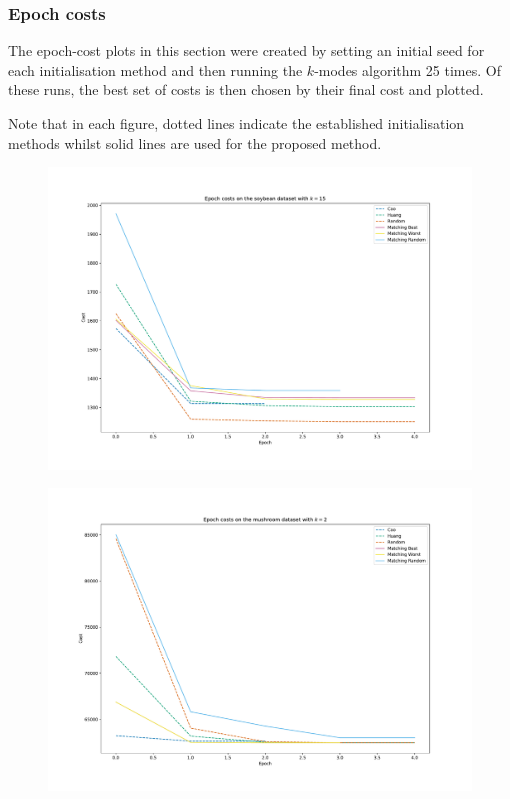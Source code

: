 \subsubsection{Epoch costs}

The epoch-cost plots in this section were created by setting an initial seed for
each initialisation method and then running the \(k\)-modes algorithm 25 times.
Of these runs, the best set of costs is then chosen by their final cost and
plotted.

Note that in each figure, dotted lines indicate the established initialisation
methods whilst solid lines are used for the proposed method.

\begin{figure}[h!]
    \centering
    \includegraphics[width=.8\textwidth]{./img/epoch_plot_soybean.pdf}
\end{figure}

\begin{figure}[h!]
    \centering
    \includegraphics[width=.8\textwidth]{./img/epoch_plot_mushroom.pdf}
\end{figure}

